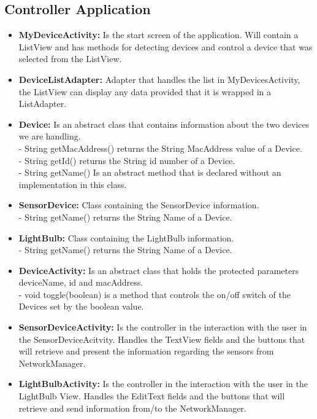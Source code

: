 \documentclass[a4paper]{article}
\begin{document}
	\subsection{Controller Application}
	\begin{itemize}
		\item{\textbf{MyDeviceActivity:}} 
		Is the start screen of the application. Will contain a ListView and has methods for detecting devices and control a device that was selected from the ListView.
		\item{\textbf{DeviceListAdapter:}} 
		Adapter that handles the list in MyDevicesActivity, the ListView can display any data provided that it is wrapped in a ListAdapter.\\ 
		\item{\textbf{Device:}} 
		Is an abstract class that contains information about the two devices we are handling. \\
        - String getMacAddress() returns the String MacAddress value of a Device.\\
        - String getId() returns the String id number of a Device.\\
        - String getName() Is an abstract method that is declared without an implementation in this class.
		\item{\textbf{SensorDevice:}} 
		Class containing the SensorDevice information.\\
        - String getName() returns the String Name of a Device.
		\item{\textbf{LightBulb:}}
		Class containing the LightBulb information.\\
        - String getName() returns the String Name of a Device.
		\item{\textbf{DeviceActivity:}} 
		Is an abstract class that holds the protected parameters deviceName, id and macAddress.\\
		- void toggle(boolean) is a method that controls the on/off switch of the Devices set by the boolean value.
		\item{\textbf{SensorDeviceActivity:}} 
		Is the controller in the interaction with the user in the SensorDeviceAcitvity. Handles the TextView fields and the buttons that will retrieve and present the information regarding the sensors from NetworkManager.
		\item{\textbf{LightBulbActivity:}} 
		Is the controller in the interaction with the user in the LightBulb View. Handles the EditText fields and the buttons that will retrieve and send information from/to the NetworkManager.
		

\end{itemize}
\end{document}
